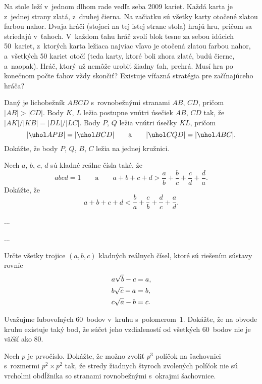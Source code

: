 {%
Na stole leží v~jednom dlhom rade vedľa seba 2009 kariet. Každá karta je z~jednej strany zlatá, z~druhej čierna. Na začiatku sú všetky karty otočené zlatou farbou nahor. Dvaja hráči (stojaci na tej istej strane stola) hrajú hru, pričom sa striedajú v~ťahoch. V~každom ťahu hráč zvolí blok tesne za sebou idúcich 50~kariet, z~ktorých karta ležiaca najviac vľavo je otočená zlatou farbou nahor, a~všetkých 50 kariet otočí (teda karty, ktoré boli zhora zlaté, budú čierne, a~naopak). Hráč, ktorý už nemôže urobiť žiadny ťah, prehrá.
 Musí hra po konečnom počte ťahov vždy skončiť?
 Existuje víťazná stratégia pre začínajúceho hráča?
}

{%
Daný je lichobežník $ABCD$ s~rovnobežnými stranami $AB$, $CD$, pričom $|AB|>|CD|$. Body $K$, $L$ ležia postupne vnútri úsečiek $AB$, $CD$ tak, že $|AK|/|KB|=|DL|/|LC|$. Body $P$, $Q$ ležia vnútri úsečky $KL$, pričom
$$
|\uhol APB|=|\uhol BCD|\qquad\text{a}\qquad|\uhol CQD|=|\uhol ABC|.
$$
Dokážte, že body $P$, $Q$, $B$, $C$ ležia na jednej kružnici.
}

{%
Nech $a$, $b$, $c$, $d$ sú kladné reálne čísla také, že
$$
abcd=1\qquad\text{a}\qquad a+b+c+d > \frac ab+\frac bc+\frac cd+\frac da.
$$
Dokážte, že
$$
a+b+c+d < \frac ba+\frac cb+\frac dc+\frac ad.
$$
}

{%
...}

{%
...}

{%
Určte všetky trojice $(a,b,c)$ kladných reálnych čísel, ktoré sú riešením sústavy rovníc
$$
\aligned
   a\sqrt{b}-c &= a,\\
   b\sqrt{c}-a &= b,\\
   c\sqrt{a}-b &= c.
\endaligned
$$}

{%
Uvažujme ľubovoľných 60~bodov v~kruhu s~polomerom~$1$. Dokážte, že na obvode kruhu existuje taký bod, že súčet jeho vzdialeností od všetkých 60~bodov nie je väčší ako $80$.}

{%
Nech $p$ je prvočíslo. Dokážte, že možno zvoliť $p^3$ políčok na šachovnici s~rozmermi $p^2\times p^2$ tak, že stredy žiadnych štyroch zvolených políčok nie sú vrcholmi obdĺžnika so stranami rovnobežnými s~okrajmi šachovnice.}


